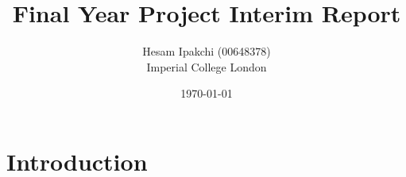 \documentclass[12pt]{article}
\numberwithin{equation}{section}
\begin{document}
\nocite{*}


\title{\textbf{Final Year Project Interim Report}}
\author{Hesam Ipakchi (00648378)\\Imperial College London}
\date{\today}
\clearpage\maketitle
\thispagestyle{empty}


\newpage
\thispagestyle{plain}
\mbox{}


\tableofcontents


\newpage
\thispagestyle{plain}
\mbox{}
\listoffigures


\newpage
\thispagestyle{plain}
\mbox{}


\section {Introduction}
\label{sec:introduction}
\end{document}
